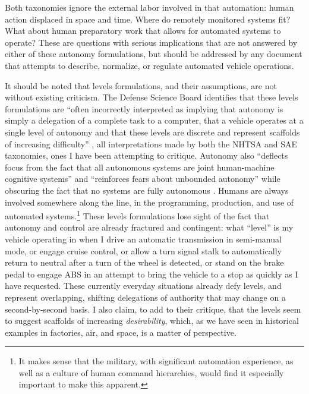 
Both
taxonomies ignore the external labor involved in that automation:
human action displaced in space and time. Where do remotely monitored
systems fit? What about human preparatory work that allows for
automated systems to operate? These are questions with serious
implications that are not
answered by either of these autonomy formulations, but should be
addressed by any document that attempts to describe, normalize, or
regulate automated vehicle operations. 


It should be noted that levels formulations, and their assumptions, are not without
existing criticism. The Defense Science Board identifies that these levels formulations are
``often incorrectly 
interpreted as implying that autonomy is simply a delegation of a
complete task to a computer, that a vehicle operates at a single level
of autonomy and that these levels are discrete and represent scaffolds
of increasing difficulty'' \cite[p. 23-24]{DSB}, all interpretations
made by both the 
NHTSA and SAE taxonomies, ones I have been
attempting to critique. Autonomy also ``deflects focus from the fact that all
autonomous systems are joint human-machine cognitive systems'' and
``reinforces fears about unbounded autonomy'' while obscuring
the fact that no systems are fully autonomous \cite[p. 24]{DSB}. Humans are always
involved somewhere along the line, in the programming, production,
and use of automated systems.\footnote{It makes sense that the
  military, with significant automation experience, as well as
a culture of
human command hierarchies, would find it especially important to make
this apparent.} These levels
formulations lose sight of the fact that autonomy and control are
already fractured and contingent:  what ``level'' is my vehicle
operating in when I drive an automatic transmission in semi-manual
mode, or engage cruise control, or allow a turn signal stalk to
automatically return to neutral after a turn of the wheel is detected,
or stand on the brake pedal to engage ABS in an attempt to bring the
vehicle to a stop as quickly as I have requested. These currently
everyday situations already defy levels, and represent overlapping, shifting
delegations of authority that may change on a second-by-second basis.
I also claim, to add to their critique, that the
levels seem to suggest scaffolds of increasing \emph{desirability},
which, as we have seen in historical examples in factories, air, and
space, is a matter of perspective. 

